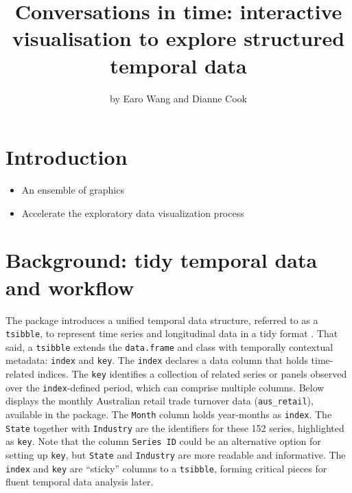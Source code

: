 \title{Conversations in time: interactive visualisation to explore
structured temporal data}
\author{by Earo Wang and Dianne Cook}

\maketitle


\hypertarget{introduction}{%
\section{Introduction}\label{introduction}}

\begin{itemize}
\tightlist
\item
  An ensemble of graphics
\item
  Accelerate the exploratory data visualization process
\end{itemize}

\hypertarget{background-tidy-temporal-data-and-workflow}{%
\section{Background: tidy temporal data and
workflow}\label{background-tidy-temporal-data-and-workflow}}

The  package \citep{wang2020tsibble} introduces a
unified temporal data structure, referred to as a \texttt{tsibble}, to
represent time series and longitudinal data in a tidy format
\citep{wickham2014tidy}. That said, a \texttt{tsibble} extends the
\texttt{data.frame} and  class with temporally
contextual metadata: \texttt{index} and \texttt{key}. The \texttt{index}
declares a data column that holds time-related indices. The \texttt{key}
identifies a collection of related series or panels observed over the
\texttt{index}-defined period, which can comprise multiple columns.
Below displays the monthly Australian retail trade turnover data
(\texttt{aus\_retail}), available in the  package.
The \texttt{Month} column holds year-months as \texttt{index}. The
\texttt{State} together with \texttt{Industry} are the identifiers for
these 152 series, highlighted as \texttt{key}. Note that the column
\texttt{Series\ ID} could be an alternative option for setting up
\texttt{key}, but \texttt{State} and \texttt{Industry} are more readable
and informative. The \texttt{index} and \texttt{key} are ``sticky''
columns to a \texttt{tsibble}, forming critical pieces for fluent
temporal data analysis later.

